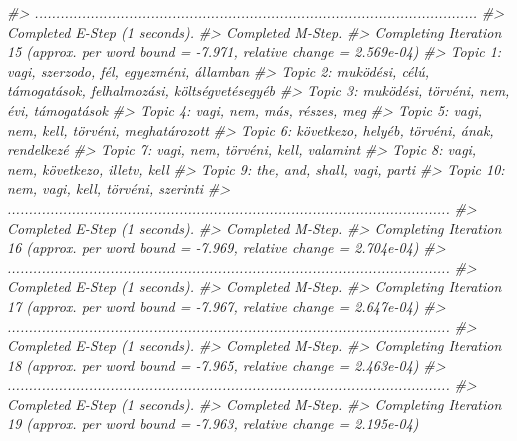 \documentclass[
]{book}
\newenvironment{Shaded}{\begin{snugshade}}{\end{snugshade}}
\newcommand{\CommentTok}[1]{\textcolor[rgb]{0.56,0.35,0.01}{\textit{#1}}}
\begin{document}
\begin{Shaded}
\begin{Highlighting}[]
\CommentTok{\#\textgreater{} .......................................................................................................}
\CommentTok{\#\textgreater{} Completed E{-}Step (1 seconds). }
\CommentTok{\#\textgreater{} Completed M{-}Step. }
\CommentTok{\#\textgreater{} Completing Iteration 15 (approx. per word bound = {-}7.971, relative change = 2.569e{-}04) }
\CommentTok{\#\textgreater{} Topic 1: vagi, szerzodo, fél, egyezméni, államban }
\CommentTok{\#\textgreater{}  Topic 2: muködési, célú, támogatások, felhalmozási, költségvetésegyéb }
\CommentTok{\#\textgreater{}  Topic 3: muködési, törvéni, nem, évi, támogatások }
\CommentTok{\#\textgreater{}  Topic 4: vagi, nem, más, részes, meg }
\CommentTok{\#\textgreater{}  Topic 5: vagi, nem, kell, törvéni, meghatározott }
\CommentTok{\#\textgreater{}  Topic 6: következo, helyéb, törvéni, ának, rendelkezé }
\CommentTok{\#\textgreater{}  Topic 7: vagi, nem, törvéni, kell, valamint }
\CommentTok{\#\textgreater{}  Topic 8: vagi, nem, következo, illetv, kell }
\CommentTok{\#\textgreater{}  Topic 9: the, and, shall, vagi, parti }
\CommentTok{\#\textgreater{}  Topic 10: nem, vagi, kell, törvéni, szerinti }
\CommentTok{\#\textgreater{} .......................................................................................................}
\CommentTok{\#\textgreater{} Completed E{-}Step (1 seconds). }
\CommentTok{\#\textgreater{} Completed M{-}Step. }
\CommentTok{\#\textgreater{} Completing Iteration 16 (approx. per word bound = {-}7.969, relative change = 2.704e{-}04) }
\CommentTok{\#\textgreater{} .......................................................................................................}
\CommentTok{\#\textgreater{} Completed E{-}Step (1 seconds). }
\CommentTok{\#\textgreater{} Completed M{-}Step. }
\CommentTok{\#\textgreater{} Completing Iteration 17 (approx. per word bound = {-}7.967, relative change = 2.647e{-}04) }
\CommentTok{\#\textgreater{} .......................................................................................................}
\CommentTok{\#\textgreater{} Completed E{-}Step (1 seconds). }
\CommentTok{\#\textgreater{} Completed M{-}Step. }
\CommentTok{\#\textgreater{} Completing Iteration 18 (approx. per word bound = {-}7.965, relative change = 2.463e{-}04) }
\CommentTok{\#\textgreater{} .......................................................................................................}
\CommentTok{\#\textgreater{} Completed E{-}Step (1 seconds). }
\CommentTok{\#\textgreater{} Completed M{-}Step. }
\CommentTok{\#\textgreater{} Completing Iteration 19 (approx. per word bound = {-}7.963, relative change = 2.195e{-}04) }

\end{Highlighting}
\end{Shaded}
\end{document}
